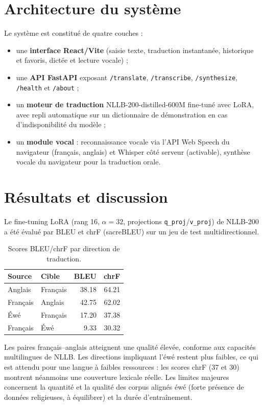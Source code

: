 \documentclass[12pt,a4paper]{report}
\begin{document}
\chapter{Architecture du système}
Le système est constitué de quatre couches :
\begin{itemize}
  \item une \textbf{interface React/Vite} (saisie texte, traduction instantanée, historique et favoris, dictée et lecture vocale) ;
  \item une \textbf{API FastAPI} exposant \texttt{/translate}, \texttt{/transcribe}, \texttt{/synthesize}, \texttt{/health} et \texttt{/about} ;
  \item un \textbf{moteur de traduction} NLLB-200-distilled-600M fine-tuné avec LoRA, avec repli automatique sur un dictionnaire de démonstration en cas d'indisponibilité du modèle ;
  \item un \textbf{module vocal} : reconnaissance vocale via l'API Web Speech du navigateur (français, anglais) et Whisper côté serveur (activable), synthèse vocale du navigateur pour la traduction orale.
\end{itemize}

\chapter{Résultats et discussion}
Le fine-tuning LoRA (rang 16, $\alpha=32$, projections \texttt{q\_proj}/\texttt{v\_proj}) de NLLB-200 a été évalué par BLEU et chrF (sacreBLEU) sur un jeu de test multidirectionnel.

\begin{table}[h]
\centering
\begin{tabular}{llrr}
\toprule
Source & Cible & BLEU & chrF \\
\midrule
Anglais & Français & 38.18 & 64.21 \\
Français & Anglais & 42.75 & 62.02 \\
Éwé & Français & 17.20 & 37.38 \\
Français & Éwé & 9.33 & 30.32 \\
\bottomrule
\end{tabular}
\caption{Scores BLEU/chrF par direction de traduction.}
\end{table}

Les paires français--anglais atteignent une qualité élevée, conforme aux capacités multilingues de NLLB. Les directions impliquant l'éwé restent plus faibles, ce qui est attendu pour une langue à faibles ressources : les scores chrF (37 et 30) montrent néanmoins une couverture lexicale réelle. Les limites majeures concernent la quantité et la qualité des corpus alignés éwé (forte présence de données religieuses, à équilibrer) et la durée d'entraînement.
\end{document}
